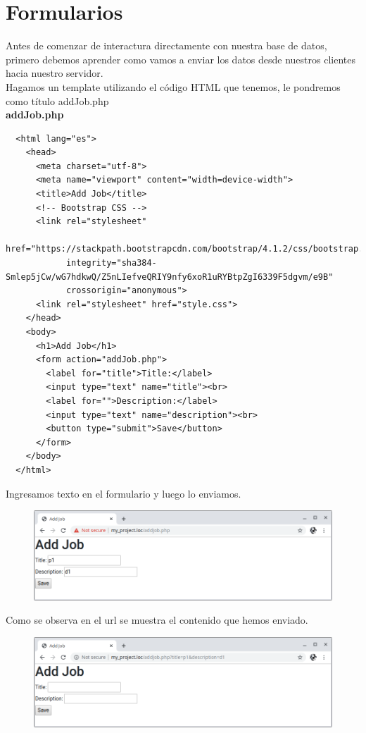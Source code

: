 \documentclass{article}
\begin{document}
\section{Formularios}%
Antes de comenzar de interactura directamente con nuestra base de datos,
primero debemos aprender como vamos a enviar los datos desde nuestros clientes
hacia nuestro servidor.\\

Hagamos un template utilizando el código HTML que tenemos, le pondremos como
título addJob.php\\

\textbf{addJob.php}
\begin{verbatim}
  <html lang="es">
    <head>
      <meta charset="utf-8">
      <meta name="viewport" content="width=device-width">
      <title>Add Job</title>
      <!-- Bootstrap CSS -->
      <link rel="stylesheet"
            href="https://stackpath.bootstrapcdn.com/bootstrap/4.1.2/css/bootstrap.min.css"
            integrity="sha384-Smlep5jCw/wG7hdkwQ/Z5nLIefveQRIY9nfy6xoR1uRYBtpZgI6339F5dgvm/e9B"
            crossorigin="anonymous">
      <link rel="stylesheet" href="style.css">
    </head>
    <body>
      <h1>Add Job</h1>
      <form action="addJob.php">
        <label for="title">Title:</label>
        <input type="text" name="title"><br>
        <label for="">Description:</label>
        <input type="text" name="description"><br>
        <button type="submit">Save</button>
      </form>
    </body>
  </html>
\end{verbatim}

Ingresamos texto en el formulario y luego lo enviamos.\\
\begin{figure}[h!]
  \centering
  \includegraphics[scale=0.5]{./Pictures/062_formulario.png}
\end{figure}

Como se observa en el url se muestra el contenido que hemos enviado.\\
\begin{figure}[h!]
  \centering
  \includegraphics[scale=0.5]{./Pictures/063_formulario.png}
\end{figure}
\end{document}
